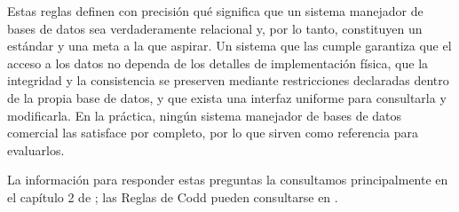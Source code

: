 \begin{enumerate}[i.]
	      Estas reglas definen con precisión qué significa que un sistema manejador de bases de datos sea verdaderamente relacional y, por lo tanto, constituyen un estándar y una meta a la que aspirar. Un sistema que las cumple garantiza que el acceso a los datos no dependa de los detalles de implementación física, que la integridad y la consistencia se preserven mediante restricciones declaradas dentro de la propia base de datos, y que exista una interfaz uniforme para consultarla y modificarla. En la práctica, ningún sistema manejador de bases de datos comercial las satisface por completo, por lo que sirven como referencia para evaluarlos.



\end{enumerate}


La información para responder estas preguntas la consultamos principalmente en el capítulo 2 de \parencite{silberschatz2006}; las Reglas de Codd pueden consultarse en \parencite{codd12rules}.
